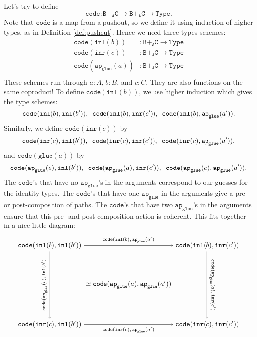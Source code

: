 \message{ !name(notes.tex)}\documentclass[12pt]{amsart}
\newcommand{\from}{\colon}
\newcommand{\type}[1]{\mathtt{#1}}
\newcommand{\tin}{\colon}
\newcommand{\A}{\type{A}}
\newcommand{\B}{\type{B}}
\newcommand{\C}{\type{C}}
\newcommand{\BAC}{\B +_{\A} \C}
\newcommand{\Type}{\type{Type}}
\newcommand{\ap}{\type{ap}}
\newcommand{\inl}{\type{inl}}
\newcommand{\inr}{\type{inr}}
\newcommand{\glue}{\type{glue}}
\newcommand{\code}{\type{code}}
\theoremstyle{remark}
\theoremstyle{definition}
\begin{document}
Let's try to define 
\[
	\code \from 
	\BAC \to \BAC \to \Type.
\]  
Note that $\code$ is a map from a pushout, 
so we define it using induction of higher types, 
as in Definition \ref{def:pushout}.
Hence we need three types schemes:
\begin{align*}
	\code(\inl(b)) & \from \BAC \to \Type \\
	\code(\inr(c)) & \from \BAC \to \Type \\
	\code( \ap_{\glue} (a) ) & \from \BAC \to \Type \\
\end{align*}
These schemes run through 
$a \tin A$, $b \tin B$, and $c \tin C$.  
They are also functions on the same coproduct!
To define $\code(\inl(b))$, 
we use higher induction which gives the type schemes:
\[
	\code(\inl(b),\inl(b')), \hspace{0.5em}
	\code(\inl(b),\inr(c')), \hspace{0.5em}
	\code(\inl(b),\ap_{\glue}(a')).
\]
Similarly, we define $\code(\inr(c))$ by
\[
	\code(\inr(c),\inl(b')), \hspace{0.5em}
	\code(\inr(c),\inr(c')) , \hspace{0.5em}
	\code(\inr(c),\ap_{\glue}(a')).
\]
and $\code(\glue(a))$ by 
\[
	\code(\ap_{\glue}(a),\inl(b')), \hspace{0.5em}
	\code(\ap_{\glue}(a),\inr(c')) , \hspace{0.5em} 
	\code(\ap_{\glue}(a),\ap_{\glue}(a')).
\]
The $\code$'s that have no $\ap_{\glue}$'s in the arguments correspond
to our guesses for the identity types.  The $\code$'s that have one
$\ap_{\glue}$ in the arguments give a pre- or post-composition of
paths.  The $\code$'s that have two $\ap_{\glue}$'s in the arguments
ensure that this pre- and post-composition action is coherent.  This
fits together in a nice little diagram:
\[ %
	\begin{tikzpicture}
		\node (AA) at (0,0) 
			{ $ \simeq \type{ code } ( \ap_{\glue} ( a ) , \ap_{\glue} ( a' )  )$ }; 
		\node (BB) at (-4,2) 
			{ $ \type{ code } ( \inl( b ) , \inl( b' )  )$ }; 
		\node (BC) at (4,2) 
			{ $ \type{ code } ( \inl( b ) , \inr( c' )  )$ }; 
		\node (CB) at (-4,-2) 
			{ $ \type{ code } ( \inr( c ) , \inl( b' )  )$ }; 
		\node (CC) at (4,-2) 
			{ $ \type{ code } ( \inr( c ) , \inr( c' )  )$ }; 
		\draw [->] (BB) to 
			node 
				[above] 
				{\scriptsize $ \type{ code } ( \inl( b ) , \ap_{\glue} ( a' ) $ } 
			(BC);
		\draw [->] (BB) to 	
			node 
				[rotate=90,above] 
				{ \scriptsize $ \type{ code } ( \ap_{\glue} ( a ) , \inl( b' ) $ } 
			(CB);
		\draw [->] (BC) to 
			node 
				[rotate=-90, above] 
				{\scriptsize $\type{ code } ( \ap_{\glue} ( a ) , \inr( c' ) $} 
			(CC);
		\draw [->] (CB) to 	
			node 
				[below] 
				{ \scriptsize $ \type{ code } ( \inr( c ) , \ap_{\glue} ( a' ) $ } 
			(CC);
	\end{tikzpicture}
\]
\end{document}
